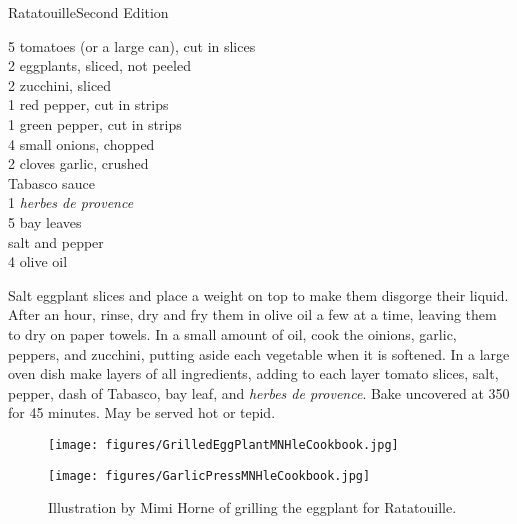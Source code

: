 \begin{entry}{Ratatouille}{Second Edition}
\begin{open}
\end{open}
\begin{ingredients}
  5 tomatoes (or a large can), cut in slices\\
  2 eggplants, sliced, not peeled \\
  2 zucchini, sliced \\
  1 red pepper, cut in strips \\
  1 green pepper, cut in strips \\
  4 small onions, chopped \\
  2 cloves garlic, crushed \\
  Tabasco sauce \\
  \SI{1}{\tblspoon} \emph{herbes de provence} \\
  5 bay leaves \\
  salt and pepper \\
  \SI{4}{\tblspoon} olive oil \\

\end{ingredients}

Salt eggplant slices and place a weight on top to make them disgorge their liquid. After an hour, rinse, dry and fry them in olive oil a few at a time, leaving them to dry on paper towels. In a small amount of oil, cook the oinions, garlic, peppers, and zucchini, putting aside each vegetable when it is softened. In a large oven dish make layers of all ingredients, adding to each layer tomato slices, salt, pepper, dash of Tabasco, bay leaf, and \emph{herbes de provence}. Bake uncovered at \SI{350}{\degreeF} for 45 minutes. May be served hot or tepid.

\begin{figure}
  \centering
  \texttt{[image: figures/GrilledEggPlantMNHleCookbook.jpg]}
  \caption{}
  \label{fig:mimi_eggplant}
\end{figure}

\begin{figure}
  \centering
  \texttt{[image: figures/GarlicPressMNHleCookbook.jpg]}
  \caption{Illustration by Mimi Horne of grilling the eggplant for Ratatouille.}
  \label{fig:mimi_garlic}
\end{figure}

\end{entry}

